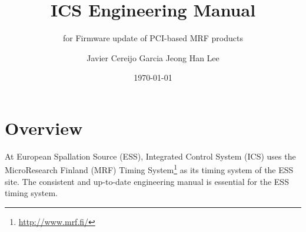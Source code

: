 \documentclass[11pt
  , a4paper
  , article
  , oneside
  , showtrims
]{memoir}
\begin{document}
%

%

%
\date{\today}

%

%

%

%
\title{ICS Engineering Manual}
\subtitle{for Firmware update of PCI-based MRF products}
\author{Javier Cereijo Garcia \newline Jeong Han Lee}





\showtrimson

\esstitle
\newpage
\tableofcontents
\newpage



\chapter{Overview}
At European Spallation Source (ESS), Integrated Control System (ICS) uses the MicroResearch Finland (MRF) Timing System{\footnote{\url{http://www.mrf.fi/}}} as its timing system of the ESS site. The consistent and up-to-date engineering manual is essential for the ESS timing system.\\
\end{document}
